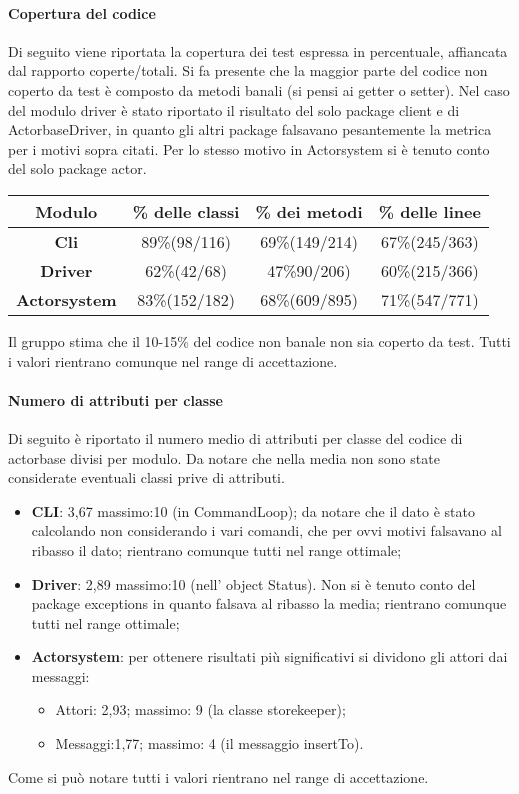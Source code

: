 \documentclass{scalatekids-article}
\begin{document}
\paragraph{Copertura del codice}
Di seguito viene riportata la copertura dei test espressa in percentuale, affiancata dal rapporto coperte/totali. Si fa presente che la maggior parte del codice non coperto da test è composto da metodi banali (si pensi ai getter o setter). Nel caso del  modulo driver è stato riportato il risultato del solo package client e di ActorbaseDriver, in quanto gli altri package falsavano pesantemente la metrica per i motivi sopra citati. Per lo stesso motivo in Actorsystem si è tenuto conto del solo package actor.
\begin{center}
	\begin{tabular}{| c | c | c | c |}
		\hline
		Modulo & \% delle classi & \% dei metodi & \% delle linee \\
		\hline
		\textbf{Cli} & 89\%(98/116) & 69\%(149/214) & 67\%(245/363) \\
		\textbf{Driver} &  62\%(42/68) & 47\%90/206) & 60\%(215/366)\\
		\textbf{Actorsystem} & 83\%(152/182) & 68\%(609/895) & 71\%(547/771)\\
		\hline
	\end{tabular}
	\end{center}
	Il gruppo stima che il 10-15\% del codice non banale non sia coperto da test. Tutti i valori rientrano comunque nel range di accettazione.
	\paragraph{Numero di attributi per classe}
	Di seguito è riportato il numero medio di attributi per classe del codice di actorbase divisi per modulo. Da notare che nella media non sono state considerate eventuali classi prive di attributi.
	\begin{itemize}
		\item \textbf{CLI}: 3,67 massimo:10 (in CommandLoop); da notare che il dato è stato calcolando non considerando i vari comandi, che per ovvi motivi falsavano al ribasso il dato; rientrano comunque tutti nel range ottimale;
		\item \textbf{Driver}: 2,89 massimo:10 (nell' object Status). Non si è tenuto conto del package exceptions in quanto falsava al ribasso la media; rientrano comunque tutti nel range ottimale;
		\item \textbf{Actorsystem}: per ottenere risultati più significativi si dividono gli attori dai messaggi:
		\begin{itemize}
			\item Attori: 2,93; massimo: 9 (la classe storekeeper);
			\item Messaggi:1,77; massimo: 4 (il messaggio insertTo).
		\end{itemize}
	\end{itemize}
	Come si può notare tutti i valori rientrano nel range di accettazione.
	
\end{document}
